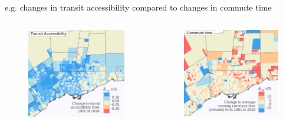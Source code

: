 \documentclass[aspectratio=169]{beamer}
\begin{document}
\begin{frame}
	
	e.g. changes in transit accessibility compared to changes in commute time
	
	
	\begin{columns}
		\begin{column}{0.5\textwidth}
			
			\begin{figure}
				\centering
				\includegraphics[width=0.97\linewidth]{images/delta_access.png}
			\end{figure}
			
		\end{column}
		
		\begin{column}{0.5\textwidth}
			
			\begin{figure}
				\centering
				\includegraphics[width=0.97\linewidth]{images/delta_commute.png}
			\end{figure}
						

\end{column}
\end{columns}
\end{frame}
\end{document}
